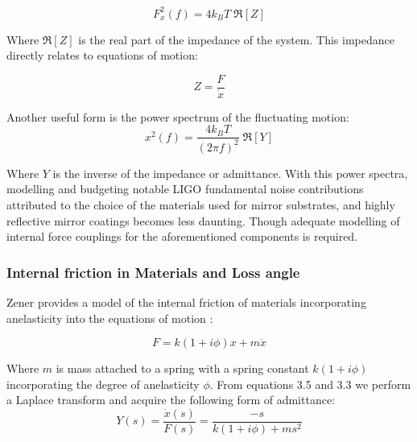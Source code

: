 

\begin{equation}
F_x^2(f) = 4 k_B T\; \Re[Z]
\end{equation}

 \noindent Where $\Re[Z]$ is the real part of the impedance of the system. This impedance directly relates to equations of motion:

 \begin{equation}
 Z = \frac{F}{\dot{x}}
 \end{equation}

\noindent Another useful form is the power spectrum of the fluctuating motion:
\begin{equation}\label{fdtpsd}
x^2 (f)  = \frac{4k_B T}{(2 \pi f)^2}\; \Re[Y]
\end{equation}

Where $Y$ is the inverse of the impedance or admittance. With this power spectra, modelling and budgeting notable LIGO fundamental noise contributions attributed to the choice of the materials used for mirror substrates, and highly reflective mirror coatings becomes less daunting. Though adequate modelling of internal force couplings for the aforementioned components is required.

\subsubsection{Internal friction in Materials and Loss angle}

Zener provides a model of the internal friction of materials incorporating anelasticity into the equations of motion \cite{zener:1948}:

\begin{equation}
F = k(1+i\phi)x + m\ddot{x}
\end{equation}

Where $m$ is mass attached to a spring with a spring constant $k(1+ i\phi)$ incorporating the degree of anelasticity $\phi$. From equations 3.5 and 3.3 we perform a Laplace transform and acquire the following form of admittance:
\begin{equation}
Y(s) = \frac{\dot{x}(s)}{F(s)} = \frac{-s}{k(1+i\phi) + ms^2}
\end{equation}

